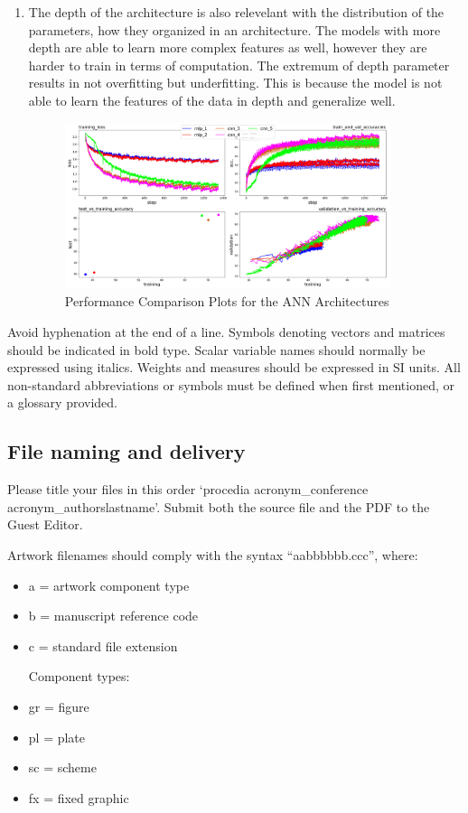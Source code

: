 \documentclass[3p,times,procedia]{elsarticle}
\begin{document}
\begin{enumerate}
    \item The depth of the architecture is also relevelant with the distribution of the parameters, how they organized in an architecture. The models with more depth are able to learn more complex features as well, however they are harder to train in terms of computation.
    The extremum of depth parameter results in not overfitting but underfitting. This is because the model is not able to learn the features of the data in depth and generalize well.

    \begin{figure}[H]
        \centering
        \includegraphics[width=0.9\textwidth, trim={0 0cm 0 0cm}]{figures/aa.png}
        \caption{Performance Comparison Plots for the ANN Architectures} 
        \label{fig:perf}
    \end{figure}

\end{enumerate}

    Avoid hyphenation at the end of a line. Symbols denoting vectors and matrices should be indicated in bold type. Scalar variable names should normally be expressed using italics. Weights and measures should be expressed in SI units. All non-standard abbreviations or symbols must be defined when first mentioned, or a glossary provided.

\subsection{File naming and delivery}
Please title your files in this order `procedia acronym\_conference acronym\_authorslastname'.  Submit both the source file and the PDF to the Guest Editor.

Artwork filenames should comply with the syntax ``aabbbbbb.ccc'', where:
\begin{itemize}
\item a = artwork component type
\item b = manuscript reference code
\item c = standard file extension

Component types:
\item gr = figure
\item pl = plate
\item sc = scheme
\item fx = fixed graphic
\end{itemize}
\end{document}
